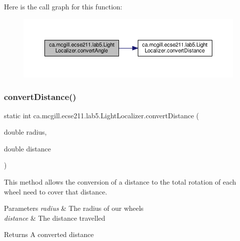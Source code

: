 Here is the call graph for this function\+:
\nopagebreak
\begin{figure}[H]
\begin{center}
\leavevmode
\includegraphics[width=350pt]{classca_1_1mcgill_1_1ecse211_1_1lab5_1_1_light_localizer_ab9d7289c4badf692fd5c83635305f2c5_cgraph}
\end{center}
\end{figure}
\mbox{\label{classca_1_1mcgill_1_1ecse211_1_1lab5_1_1_light_localizer_a9eebe889aa2d4d2e881f413cc727cd9c}} 
\subsubsection{\texorpdfstring{convert\+Distance()}{convertDistance()}}
{\footnotesize\ttfamily static int ca.\+mcgill.\+ecse211.\+lab5.\+Light\+Localizer.\+convert\+Distance (\begin{DoxyParamCaption}\item[{double}]{radius,  }\item[{double}]{distance }\end{DoxyParamCaption})\hspace{0.3cm}{\ttfamily [static]}}

This method allows the conversion of a distance to the total rotation of each wheel need to cover that distance.


\begin{DoxyParams}{Parameters}
{\em radius} & The radius of our wheels \\
\hline
{\em distance} & The distance travelled \\
\hline
\end{DoxyParams}
\begin{DoxyReturn}{Returns}
A converted distance 
\end{DoxyReturn}


